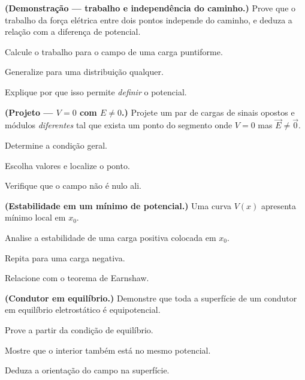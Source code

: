 \blocodesafio
\begin{questao}[4]{}

\textbf{(Demonstração --- trabalho e independência do caminho.)} Prove que o
trabalho da força elétrica entre dois pontos independe do caminho, e deduza a
relação com a diferença de potencial.
\begin{itensq}
\item Calcule o trabalho para o campo de uma carga puntiforme.
\item Generalize para uma distribuição qualquer.
\item Explique por que isso permite \emph{definir} o potencial.
\end{itensq}


\end{questao}
\begin{questao}[4]{}

\textbf{(Projeto --- $V=0$ com $E\neq0$.)} Projete um par de cargas de sinais
opostos e módulos \emph{diferentes} tal que exista um ponto do segmento onde
$V=0$ mas $\vec E\neq\vec0$.
\begin{itensq}
\item Determine a condição geral.
\item Escolha valores e localize o ponto.
\item Verifique que o campo não é nulo ali.
\end{itensq}


\end{questao}
\begin{questao}[4]{}

\textbf{(Estabilidade em um mínimo de potencial.)} Uma curva
$V(x)$ apresenta mínimo local em $x_0$.
\begin{itensq}
\item Analise a estabilidade de uma carga positiva colocada em $x_0$.
\item Repita para uma carga negativa.
\item Relacione com o teorema de Earnshaw.
\end{itensq}


\end{questao}
\begin{questao}[4]{}

\textbf{(Condutor em equilíbrio.)} Demonstre que toda a superfície de um
condutor em equilíbrio eletrostático é equipotencial.
\begin{itensq}
\item Prove a partir da condição de equilíbrio.
\item Mostre que o interior também está no mesmo potencial.
\item Deduza a orientação do campo na superfície.
\end{itensq}


\end{questao}
